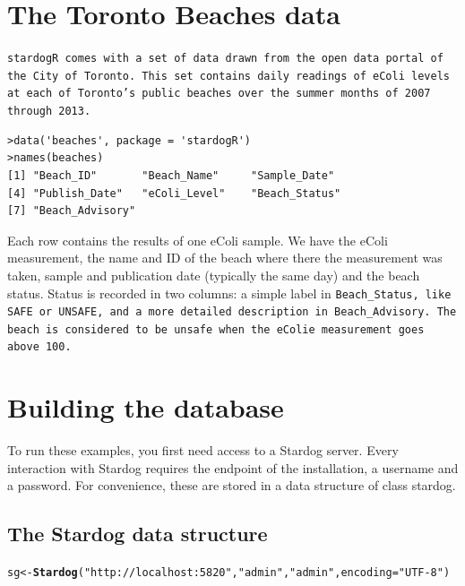 \documentclass{article}\usepackage[]{graphicx}\usepackage[]{xcolor}
\makeatletter
\newcommand{\hlstr}[1]{\textcolor[rgb]{0.192,0.494,0.8}{#1}}%
\newcommand{\hlstd}[1]{\textcolor[rgb]{0.345,0.345,0.345}{#1}}%
\newcommand{\hlkwb}[1]{\textcolor[rgb]{0.69,0.353,0.396}{#1}}%
\newcommand{\hlkwc}[1]{\textcolor[rgb]{0.333,0.667,0.333}{#1}}%
\newcommand{\hlkwd}[1]{\textcolor[rgb]{0.737,0.353,0.396}{\textbf{#1}}}%
\newenvironment{kframe}{%
 \def\at@end@of@kframe{}%
 \ifinner\ifhmode%
  \def\at@end@of@kframe{\end{minipage}}%
  \begin{minipage}{\columnwidth}%
 \fi\fi%
 \def\FrameCommand##1{\hskip\@totalleftmargin \hskip-\fboxsep
 \colorbox{shadecolor}{##1}\hskip-\fboxsep
     \hskip-\linewidth \hskip-\@totalleftmargin \hskip\columnwidth}%
 \MakeFramed {\advance\hsize-\width
   \@totalleftmargin\z@ \linewidth\hsize
   \@setminipage}}%
 {\par\unskip\endMakeFramed%
 \at@end@of@kframe}
\newenvironment{knitrout}{}{} %
\makeatother
\begin{document}
\section{The Toronto Beaches data}

\tt{stardogR} comes with a set of data drawn from the open data portal of the City of Toronto. This set contains daily readings of eColi levels at each of Toronto's public beaches over the summer months of 2007 through 2013.

\begin{verbatim}
>data('beaches', package = 'stardogR')
>names(beaches)
[1] "Beach_ID"       "Beach_Name"     "Sample_Date"
[4] "Publish_Date"   "eColi_Level"    "Beach_Status"
[7] "Beach_Advisory"
\end{verbatim}

Each row contains the results of one eColi sample. We have the eColi measurement, the name and ID of the beach where there the measurement was taken, sample and publication date (typically the same day) and the beach status. Status is recorded in two columns: a simple label in \tt{Beach\_Status}, like SAFE or UNSAFE, and a more detailed description in \tt{Beach\_Advisory}.  The beach is considered to be unsafe when the eColie measurement goes above 100.


\section{Building the database}

To run these examples, you first need access to a Stardog server. Every interaction with Stardog requires the endpoint of the installation, a username and a password. For convenience, these are stored in a data structure of class stardog.

\subsection{The Stardog data structure}

\begin{knitrout}
\color{fgcolor}\begin{kframe}
\begin{alltt}
\hlstd{sg} \hlkwb{<-} \hlkwd{Stardog}\hlstd{(}\hlstr{"http://localhost:5820"}\hlstd{,} \hlstr{"admin"}\hlstd{,} \hlstr{"admin"}\hlstd{,} \hlkwc{encoding} \hlstd{=} \hlstr{"UTF-8"}\hlstd{)}
\end{alltt}
\end{kframe}
\end{knitrout}
\end{document}
